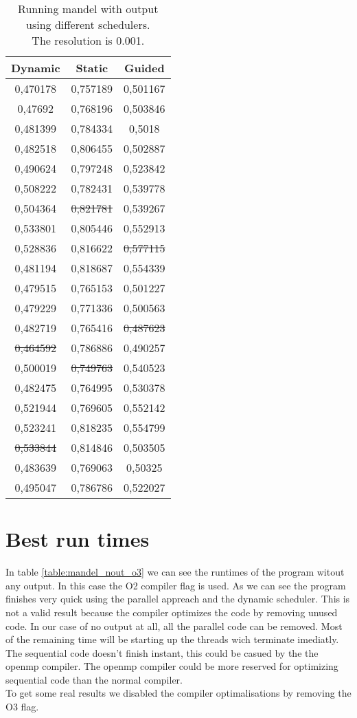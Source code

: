 \documentclass[a4paper]{article}
\begin{document}
\begin{table}[h]
	\caption{Running mandel with output using different schedulers.\\The resolution is 0.001.}
	\label{table:mandel_schedulers}
	\begin{center}
		\begin{tabular}{| c | c | c |}
			\hline
			Dynamic & Static & Guided\\ 
			\hline
			0,470178 & 0,757189 & 0,501167\\ 
			0,47692 & 0,768196 & 0,503846\\ 
			0,481399 & 0,784334 & 0,5018\\ 
			0,482518 & 0,806455 & 0,502887\\ 
			0,490624 & 0,797248 & 0,523842\\ 
			0,508222 & 0,782431 & 0,539778\\ 
			0,504364 & \st{0,821781} & 0,539267\\ 
			0,533801 & 0,805446 & 0,552913\\ 
			0,528836 & 0,816622 & \st{0,577115}\\ 
			0,481194 & 0,818687 & 0,554339\\ 
			0,479515 & 0,765153 & 0,501227\\ 
			0,479229 & 0,771336 & 0,500563\\ 
			0,482719 & 0,765416 & \st{0,487623}\\ 
			\st{0,464592} & 0,786886 & 0,490257\\ 
			0,500019 & \st{0,749763} & 0,540523\\ 
			0,482475 & 0,764995 & 0,530378\\ 
			0,521944 & 0,769605 & 0,552142\\ 
			0,523241 & 0,818235 & 0,554799\\ 
			\st{0,533844} & 0,814846 & 0,503505\\ 
			0,483639 & 0,769063 & 0,50325\\ 
			\hline
			0,495047 & 0,786786 & 0,522027\\ 
			\hline
		\end{tabular}
	\end{center}
\end{table}

\section{Best run times}
	In table \ref{table:mandel_nout_o3} we can see the runtimes of the program witout any output.
	In this case the O2 compiler flag is used.
	As we can see the program finishes very quick using the parallel appreach and the dynamic scheduler.
	This is not a valid result because the compiler optimizes the code by removing unused code.
	In our case of no output at all, all the parallel code can be removed.
	Most of the remaining time will be starting up the threads wich terminate imediatly.
	The sequential code doesn't finish instant, this could be casued by the the openmp compiler.
	The openmp compiler could be more reserved for optimizing sequential code than the normal compiler.\\
	To get some real results we disabled the compiler optimalisations by removing the O3 flag.
	
\end{document}
